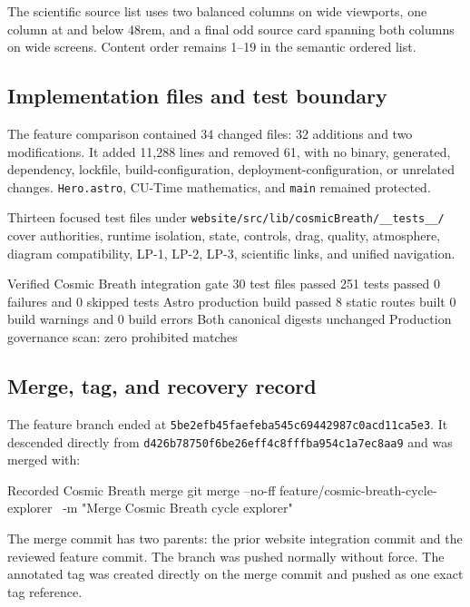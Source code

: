 \documentclass[11pt,letterpaper]{article}
\newcommand{\filepath}[1]{\nolinkurl{#1}}
\newcommand{\branchname}[1]{\texttt{#1}}
\begin{document}
The scientific source list uses two balanced columns on wide viewports, one
column at and below 48rem, and a final odd source card spanning both columns on
wide screens. Content order remains 1--19 in the semantic ordered list.

\subsection{Implementation files and test boundary}

The feature comparison contained 34 changed files: 32 additions and two
modifications. It added 11,288 lines and removed 61, with no binary, generated,
dependency, lockfile, build-configuration, deployment-configuration, or
unrelated changes. \filepath{Hero.astro}, CU-Time mathematics, and
\branchname{main} remained protected.

Thirteen focused test files under
\filepath{website/src/lib/cosmicBreath/__tests__/} cover authorities, runtime
isolation, state, controls, drag, quality, atmosphere, diagram compatibility,
LP-1, LP-2, LP-3, scientific links, and unified navigation.

\begin{codebox}{Verified Cosmic Breath integration gate}
30 test files passed
251 tests passed
0 failures and 0 skipped tests
Astro production build passed
8 static routes built
0 build warnings and 0 build errors
Both canonical digests unchanged
Production governance scan: zero prohibited matches
\end{codebox}

\subsection{Merge, tag, and recovery record}

The feature branch ended at
\filepath{5be2efb45faefeba545c69442987c0acd11ca5e3}. It descended directly from
\filepath{d426b78750f6be26eff4c8fffba954c1a7ec8aa9} and was merged with:

\begin{commandbox}{Recorded Cosmic Breath merge}
git merge --no-ff feature/cosmic-breath-cycle-explorer \
  -m "Merge Cosmic Breath cycle explorer"
\end{commandbox}

The merge commit has two parents: the prior website integration commit and the
reviewed feature commit. The branch was pushed normally without force. The
annotated tag was created directly on the merge commit and pushed as one exact
tag reference.
\end{document}
